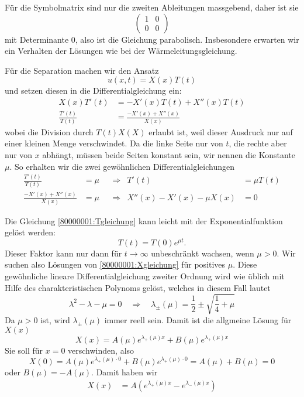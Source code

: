 \begin{loesung}
\begin{teilaufgaben}
\item Für die Symbolmatrix sind nur die zweiten Ableitungen massgebend,
daher ist sie
\[
\begin{pmatrix}
1&0\\
0&0
\end{pmatrix}
\]
mit Determinante $0$, also ist die Gleichung parabolisch.
Insbesondere erwarten wir ein Verhalten der Lösungen wie
bei der Wärmeleitungsgleichung.
\item Für die Separation machen wir den Ansatz
\[
u(x,t)=X(x)T(t)
\]
und setzen diesen in die Differentialgleichung ein:
\begin{align*}
X(x)T'(t)&=-X'(x)T(t)+X''(x)T(t)\\
\frac{T'(t)}{T(t)}&=\frac{-X'(x)+X''(x)}{X(x)}
\end{align*}
wobei die Division durch $T(t)X(X)$ erlaubt ist, weil
dieser Ausdruck nur auf einer kleinen Menge verschwindet.
Da die linke Seite nur von $t$, die rechte aber nur von $x$ abhängt,
müssen beide Seiten konstant sein, wir nennen die Konstante
$\mu$. So erhalten wir die zwei gewöhnlichen Differentialgleichungen
\begin{align}
\frac{T'(t)}{T(t)}&=\mu&&\Rightarrow&T'(t)&=\mu T(t)
\label{80000001:Tgleichung}
\\
\frac{-X'(x)+X''(x)}{X(x)}&=\mu&&\Rightarrow&X''(x)-X'(x)-\mu X(x)&=0
\label{80000001:Xgleichung}
\end{align}
\item
Die Gleichung \eqref{80000001:Tgleichung} kann leicht mit der Exponentialfunktion
gelöst werden:
\[
T(t)=T(0)e^{\mu t}.
\]
Dieser Faktor kann nur dann für $t\to\infty$ unbeschränkt wachsen, wenn
$\mu > 0$. Wir suchen also Lösungen von \eqref{80000001:Xgleichung} für
positives $\mu$.
Diese gewöhnliche lineare Differentialgleichung zweiter Ordnung wird
wie üblich mit Hilfe des charakteristischen Polynoms gelöst, welches
in diesem Fall lautet
\[
\lambda^2-\lambda-\mu=0
\quad
\Rightarrow
\quad
\lambda_{\pm}(\mu)=\frac12\pm\sqrt{\frac14+\mu}
\]
Da $\mu > 0$ ist, wird $\lambda_{\pm}(\mu)$ immer reell sein.
Damit ist die allgmeine Lösung für $X(x)$
\[
X(x)=
A(\mu)e^{\lambda_+(\mu)x}
+
B(\mu)e^{\lambda_+(\mu)x}
\]
Sie soll für $x=0$ verschwinden, also
\[
X(0)=
A(\mu)e^{\lambda_+(\mu)\cdot 0}
+
B(\mu)e^{\lambda_+(\mu)\cdot 0}
=A(\mu)+B(\mu)=0
\]
oder $B(\mu)=-A(\mu)$. Damit haben wir
\begin{align*}
X(x)&=A(e^{\lambda_+(\mu)x}-e^{\lambda_-(\mu)x})

\end{align*}
\end{teilaufgaben}
\end{loesung}

